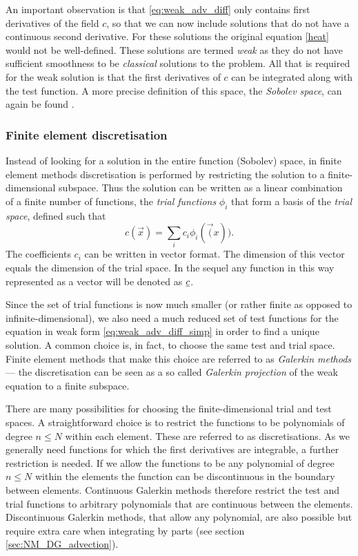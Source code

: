  An important observation is that
\eqref{eq:weak_adv_diff} only contains first derivatives of the field $c$,
so that we can now include solutions that do not have a continuous second
derivative. For these solutions the original equation \eqref{heat} would not
be well-defined. These solutions are termed \emph{weak} as they do not
have sufficient smoothness to be \emph{classical} solutions to the problem.
All that is required for the weak solution is that the first derivatives of $c$
can be integrated along with the test function. A more precise definition of
this space, the \emph{Sobolev space}, can again be found \citet{elman2005}.

\subsubsection{Finite element discretisation}
Instead of looking for a solution in the entire function (Sobolev) space,
in finite element methods discretisation is performed by restricting the solution to a
finite-dimensional subspace. Thus the solution can be
written as a linear combination of a finite number of functions,
the \emph{trial functions} $\phi_i$ that form a basis of the
\emph{trial space}, defined such that
\begin{equation*}
  c(\vec{x})=\sum_i c_i \phi_i(\vec(x)).
\end{equation*}
The coefficients $c_i$ can be written in vector format. The
dimension of this vector equals the dimension of the trial
space. In the sequel any function in
this way represented as a vector will be denoted as $\underline{c}$.

Since the set of trial functions is now much smaller (or rather finite as opposed to infinite-dimensional), we also need
a much reduced set of test functions for the equation in weak
form \eqref{eq:weak_adv_diff_simp} in order to find a unique
solution. A common choice is, in fact, to choose the same
test and trial space. Finite element methods that make this choice are
referred to as \emph{Galerkin methods} --- the discretisation
can be seen as a so called \emph{Galerkin
projection} of the weak equation to a finite subspace.

There are many possibilities for choosing the finite-dimensional trial and test spaces.
A straightforward choice is to restrict the functions to be polynomials of degree
$n\leq N$ within each element. These are referred to as \PN discretisations.
As we generally need functions for which the first
derivatives are integrable, a further restriction
is needed. If we allow the functions to be any polynomial of
degree $n\leq N$ within the elements the function can be
discontinuous in the boundary between elements.
Continuous Galerkin methods therefore
restrict the test and trial functions to arbitrary polynomials
that are continuous between the elements. Discontinuous Galerkin methods,
that allow any polynomial, are also possible but require
extra care when integrating by parts (see section \ref{sec:NM_DG_advection}).

